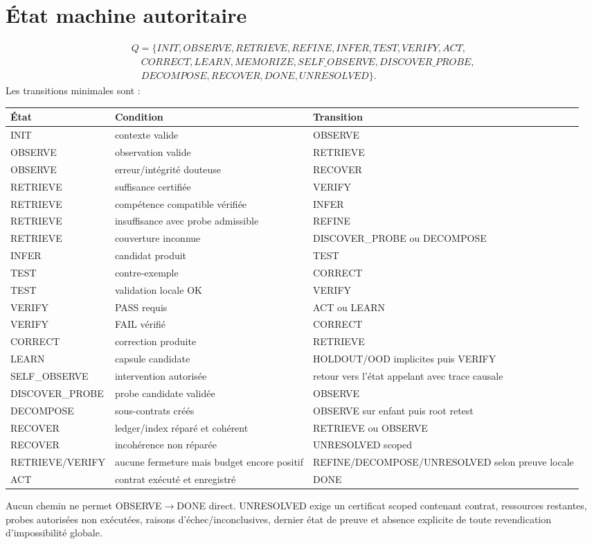 \documentclass[11pt,a4paper]{report}
\begin{document}
\chapter{État machine autoritaire}
\[
\begin{aligned}
Q=\{INIT,OBSERVE,RETRIEVE,REFINE,INFER,TEST,VERIFY,ACT,\\
\quad CORRECT,LEARN,MEMORIZE,SELF\_OBSERVE,DISCOVER\_PROBE,\\
\quad DECOMPOSE,RECOVER,DONE,UNRESOLVED\}.
\end{aligned}
\]
Les transitions minimales sont :
\small\begin{longtable}{L{0.22\textwidth}L{0.24\textwidth}L{0.44\textwidth}}
\toprule État & Condition & Transition \\ \midrule
INIT & contexte valide & OBSERVE \\
OBSERVE & observation valide & RETRIEVE \\
OBSERVE & erreur/intégrité douteuse & RECOVER \\
RETRIEVE & suffisance certifiée & VERIFY \\
RETRIEVE & compétence compatible vérifiée & INFER \\
RETRIEVE & insuffisance avec probe admissible & REFINE \\
RETRIEVE & couverture inconnue & DISCOVER\_PROBE ou DECOMPOSE \\
INFER & candidat produit & TEST \\
TEST & contre-exemple & CORRECT \\
TEST & validation locale OK & VERIFY \\
VERIFY & PASS requis & ACT ou LEARN \\
VERIFY & FAIL vérifié & CORRECT \\
CORRECT & correction produite & RETRIEVE \\
LEARN & capsule candidate & HOLDOUT/OOD implicites puis VERIFY \\
SELF\_OBSERVE & intervention autorisée & retour vers l'état appelant avec trace causale \\
DISCOVER\_PROBE & probe candidate validée & OBSERVE \\
DECOMPOSE & sous-contrats créés & OBSERVE sur enfant puis root retest \\
RECOVER & ledger/index réparé et cohérent & RETRIEVE ou OBSERVE \\
RECOVER & incohérence non réparée & UNRESOLVED scoped \\
RETRIEVE/VERIFY & aucune fermeture mais budget encore positif & REFINE/DECOMPOSE/UNRESOLVED selon preuve locale \\
ACT & contrat exécuté et enregistré & DONE \\
\bottomrule
\end{longtable}
Aucun chemin ne permet OBSERVE$\to$DONE direct. UNRESOLVED exige un certificat scoped contenant contrat, ressources restantes, probes autorisées non exécutées, raisons d'échec/inconclusives, dernier état de preuve et absence explicite de toute revendication d'impossibilité globale.
\end{document}

